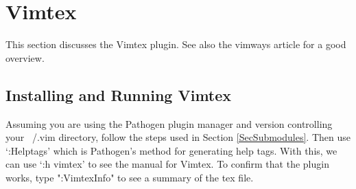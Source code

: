 \documentclass[10pt]{article}
\begin{document}
\section{Vimtex}
This section discusses the Vimtex \cite{lervag2015vim} plugin. See also the
vimways article \cite{woodruff2019latex} for a good overview.

\subsection{Installing and Running Vimtex}
Assuming you are using the Pathogen plugin manager and version controlling your
~/.vim directory, follow the steps used in Section \ref{SecSubmodules}. Then use
`:Helptags' which is Pathogen's method for generating help tags. With this, we
can use `:h vimtex' to see the manual for Vimtex. To confirm that the plugin
works, type ":VimtexInfo" to see a summary of the tex file.
\end{document}
